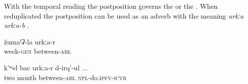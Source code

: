 With the temporal reading the postposition governs the   or the  . When reduplicated the postposition can be used as an adverb with the meaning \textit{urkːa} \textit{urkːa-b} .


\begin{exe}
	\ex
	\begin{xlist}
		\ex	\label{withinoneweek}
		\gll	žumaˁʡ-la	urkːa-r  \\
			week-\textsc{gen}	between-\textsc{abl}\\
		\glt	{}

		\ex	\label{After two months they were doing (the medical treatment again}
		\gll	k'ʷel	bac	urkːa-r	d-irq'-ul ...\\
			two	month	between-\textsc{abl}	\textsc{npl}-do.\textsc{ipfv}-\textsc{icvb}\\
		\glt	{}
	\end{xlist}
\end{exe}



\subsection{ }
\label{ssec:postposition bi}

